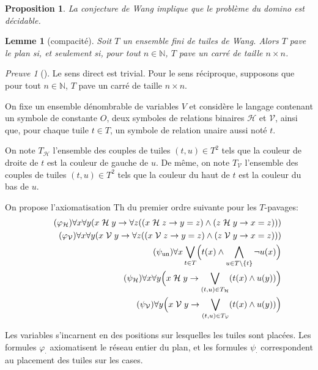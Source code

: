 \documentclass{scrartcl}
\newcommand{\N}{\mathbb N}
\renewcommand{\H}{\mathrel{\mathcal H}}
\newcommand{\V}{\mathrel{\mathcal V}}
\newtheorem{lemme}{Lemme}
\newtheorem{proposition}{Proposition}
\theoremstyle{definition}
\theoremstyle{remark}
\newtheorem{preuve}{Preuve}
\begin{document}
\begin{proposition}
  La conjecture de Wang implique que le problème du domino est décidable.
\end{proposition}

\begin{lemme}[compacité]
  Soit $T$ un ensemble fini de tuiles de Wang. Alors $T$ pave le plan si, et seulement si, pour tout $n\in\N$, $T$ pave un carré de taille $n\times n$.
\end{lemme}

\begin{preuve}[]
  Le sens direct est trivial. Pour le sens réciproque, supposons que pour tout $n\in\N$, $T$ pave un carré de taille $n\times n$.

  On fixe un ensemble dénombrable de variables $V$ et considère le langage contenant un symbole de constante $O$, deux symboles de relations binaires $\mathcal H$ et $\mathcal V$, ainsi que, pour chaque tuile $t\in T$, un symbole de relation unaire aussi noté $t$.
  
  On note $T_{\mathcal H}$ l'ensemble des couples de tuiles $(t,u)\in T^2$ tels que la couleur de droite de $t$ est la couleur de gauche de $u$. De même, on note $T_{\mathcal V}$ l'ensemble des couples de tuiles $(t,u)\in T^2$ tels que la couleur du haut de $t$ est la couleur du bas de $u$.

  On propose l'axiomatisation $\mathrm{Th}$ du premier ordre suivante pour les $T$-pavages:
  \begin{align}
    \tag{$\varphi_{\mathcal H}$}
    \forall x\forall y (x\H y\rightarrow\forall z((x\H z\rightarrow y=z)\land (z\H y\rightarrow x=z)))\\
    \tag{$\varphi_{\mathcal V}$}
    \forall x\forall y (x\V y\rightarrow\forall z((x\V z\rightarrow y=z) \land (z\V y\rightarrow x=z)))\\
    \tag{$\psi_{\mathrm{un}}$}
    \forall x\bigvee_{t\in T}\Bigl(t(x)\land\bigwedge_{u\in T\setminus\{t\}}\lnot u(x)\Bigr)\\
    \tag{$\psi_{\mathcal H}$}
    \forall x\forall y \Bigl( x\H y \rightarrow \bigvee_{(t,u)\in T_{\mathcal H}}(t(x)\land u(y))\Bigr)\\
    \tag{$\psi_{\mathcal V}$}
    \forall y \Bigl( x\V y \rightarrow \bigvee_{(t,u)\in T_{\mathcal V}}(t(x)\land u(y))\Bigr)
  \end{align}

  Les variables s'incarnent en des positions sur lesquelles les tuiles sont placées. Les formules $\varphi_\cdot$ axiomatisent le réseau entier du plan, et les formules $\psi_\cdot$ correspondent au placement des tuiles sur les cases.


\end{preuve}
\end{document}
